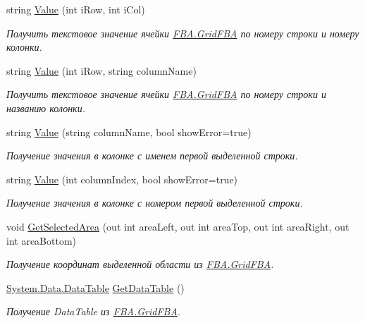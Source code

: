 \begin{DoxyCompactItemize}
string \mbox{\hyperlink{class_f_b_a_1_1_grid_f_b_a_aac34ab157c27f3f4cb88f542dbf408c9}{Value}} (int i\+Row, int i\+Col)
\begin{DoxyCompactList}\small\item\em Получить текстовое значение ячейки \mbox{\hyperlink{class_f_b_a_1_1_grid_f_b_a}{F\+B\+A.\+Grid\+F\+BA}} по номеру строки и номеру колонки. \end{DoxyCompactList}\item 
string \mbox{\hyperlink{class_f_b_a_1_1_grid_f_b_a_aa8d6a459be8af385dbbee050380f3375}{Value}} (int i\+Row, string column\+Name)
\begin{DoxyCompactList}\small\item\em Получить текстовое значение ячейки \mbox{\hyperlink{class_f_b_a_1_1_grid_f_b_a}{F\+B\+A.\+Grid\+F\+BA}} по номеру строки и названию колонки. \end{DoxyCompactList}\item 
string \mbox{\hyperlink{class_f_b_a_1_1_grid_f_b_a_a71050c522a62ec9295152323af632fcc}{Value}} (string column\+Name, bool show\+Error=true)
\begin{DoxyCompactList}\small\item\em Получение значения в колонке с именем первой выделенной строки. \end{DoxyCompactList}\item 
string \mbox{\hyperlink{class_f_b_a_1_1_grid_f_b_a_a8b226bc27fbabf8371d76debeb1d9ce9}{Value}} (int column\+Index, bool show\+Error=true)
\begin{DoxyCompactList}\small\item\em Получение значения в колонке с номером первой выделенной строки. \end{DoxyCompactList}\item 
void \mbox{\hyperlink{class_f_b_a_1_1_grid_f_b_a_a984387c70f3d6c188008862af02f590c}{Get\+Selected\+Area}} (out int area\+Left, out int area\+Top, out int area\+Right, out int area\+Bottom)
\begin{DoxyCompactList}\small\item\em Получение координат выделенной области из \mbox{\hyperlink{class_f_b_a_1_1_grid_f_b_a}{F\+B\+A.\+Grid\+F\+BA}}. \end{DoxyCompactList}\item 
\mbox{\hyperlink{_sys_static_8cs_a6542cfcff2f8e81f06ade15aa0bfe2b7}{System.\+Data.\+Data\+Table}} \mbox{\hyperlink{class_f_b_a_1_1_grid_f_b_a_a462ecf8ce1122570366b79c08c99f78d}{Get\+Data\+Table}} ()
\begin{DoxyCompactList}\small\item\em Получение Data\+Table из \mbox{\hyperlink{class_f_b_a_1_1_grid_f_b_a}{F\+B\+A.\+Grid\+F\+BA}}. \end{DoxyCompactList}\item 

\end{DoxyCompactItemize}
